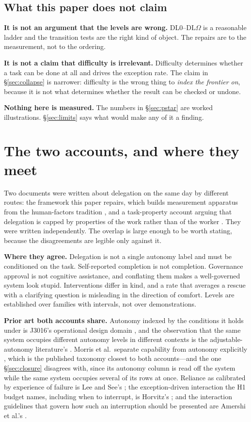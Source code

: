 \documentclass[11pt]{article}
\theoremstyle{definition}
\newcommand{\DLO}{\ensuremath{\mathrm{DL}\Omega}}
\begin{document}
\subsection{What this paper does not claim}

\textbf{It is not an argument that the levels are wrong.} DL0--\DLO{} is a reasonable ladder and the transition tests are the right kind of object. The repairs are to the measurement, not to the ordering.

\textbf{It is not a claim that difficulty is irrelevant.} Difficulty determines whether a task can be done at all and drives the exception rate. The claim in \S\ref{sec:collapse} is narrower: difficulty is the wrong thing to \emph{index the frontier on}, because it is not what determines whether the result can be checked or undone.

\textbf{Nothing here is measured.} The numbers in \S\ref{sec:pstar} are worked illustrations. \S\ref{sec:limits} says what would make any of it a finding.

\section{The two accounts, and where they meet}

Two documents were written about delegation on the same day by different routes: the framework this paper repairs, which builds measurement apparatus from the human-factors tradition \citep{sheridan1978,parasuraman2000,endsley1999,klein2004}, and a task-property account arguing that delegation is capped by properties of the work rather than of the worker \citep{yang2026taskproperty}. They were written independently. The overlap is large enough to be worth stating, because the disagreements are legible only against it.

\textbf{Where they agree.} Delegation is not a single autonomy label and must be conditioned on the task. Self-reported completion is not completion. Governance approval is not cognitive assistance, and conflating them makes a well-governed system look stupid. Interventions differ in kind, and a rate that averages a rescue with a clarifying question is misleading in the direction of comfort. Levels are established over families with intervals, not over demonstrations.

\textbf{Prior art both accounts share.} Autonomy indexed by the conditions it holds under is J3016's operational design domain \citep{sae2021j3016}, and the observation that the same system occupies different autonomy levels in different contexts is the adjustable-autonomy literature's \citep{scerri2002}. Morris et al.\ separate capability from autonomy explicitly \citep{morris2023levels}, which is the published taxonomy closest to both accounts---and the one \S\ref{sec:closure} disagrees with, since its autonomy column is read off the system while the same system occupies several of its rows at once. Reliance as calibrated by experience of failure is Lee and See's \citep{lee2004}; the exception-driven interaction the H1 budget names, including when to interrupt, is Horvitz's \citep{horvitz1999}; and the interaction guidelines that govern how such an interruption should be presented are Amershi et al.'s \citep{amershi2019}.
\end{document}
